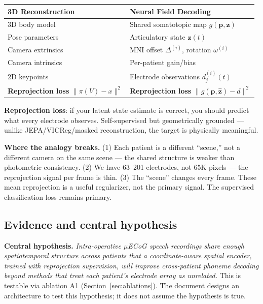 \documentclass[11pt,letterpaper]{article}
\newcommand{\bfp}{\mathbf{p}}
\newcommand{\bfz}{\mathbf{z}}
\begin{document}
\begin{table}[ht!]\centering\small
\begin{tabular}{@{}ll@{}}
\toprule
\textbf{3D Reconstruction} & \textbf{Neural Field Decoding} \\
\midrule
3D body model & Shared somatotopic map $g(\bfp, \bfz)$ \\
Pose parameters & Articulatory state $\bfz(t)$ \\
Camera extrinsics & MNI offset $\Delta^{(i)}$, rotation $\omega^{(i)}$ \\
Camera intrinsics & Per-patient gain/bias \\
2D keypoints & Electrode observations $d_j^{(i)}(t)$ \\
\textbf{Reprojection loss} $\|\pi(V) - x\|^2$ & \textbf{Reprojection loss} $\|g(\bfp, \hat{\bfz}) - d\|^2$ \\
\bottomrule
\end{tabular}
\end{table}

\textbf{Reprojection loss}: if your latent state estimate is correct, you should predict what every electrode observes. Self-supervised but geometrically grounded --- unlike JEPA/VICReg/masked reconstruction, the target is physically meaningful.

\textbf{Where the analogy breaks.} (1) Each patient is a different ``scene,'' not a different camera on the same scene --- the shared structure is weaker than photometric consistency. (2) We have 63--201 electrodes, not 65K pixels --- the reprojection signal per frame is thin. (3) The ``scene'' changes every frame. These mean reprojection is a useful regularizer, not the primary signal. The supervised classification loss remains primary.

\subsection{Evidence and central hypothesis}

\textbf{Central hypothesis.} \textit{Intra-operative $\mu$ECoG speech recordings share enough spatiotemporal structure across patients that a coordinate-aware spatial encoder, trained with reprojection supervision, will improve cross-patient phoneme decoding beyond methods that treat each patient's electrode array as unrelated.} This is testable via ablation A1 (Section~\ref{sec:ablations}). The document designs an architecture to test this hypothesis; it does not assume the hypothesis is true.
\end{document}
